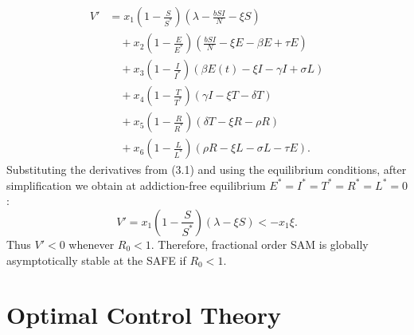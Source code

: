 \documentclass[10pt]{NSP1}
\begin{document}
\begin{equation}
\begin{aligned}
V' &= x_1 \left(1 - \frac{S}{S^*}\right) \left( \lambda - \frac{b S I}{N} - \xi S \right) \\
&\quad + x_2 \left(1 - \frac{E}{E^*}\right) \left( \frac{b S I}{N} - \xi E - \beta E + \tau E \right) \\
&\quad + x_3 \left(1 - \frac{I}{I^*}\right) \left( \beta E(t) - \xi I - \gamma I + \sigma L \right) \\
&\quad + x_4 \left(1 - \frac{T}{T^*}\right) \left( \gamma I - \xi T - \delta T \right) \\
&\quad + x_5 \left(1 - \frac{R}{R^*}\right) \left( \delta T - \xi R - \rho R \right) \\
&\quad + x_6 \left(1 - \frac{L}{L^*}\right) \left( \rho R - \xi L - \sigma L - \tau E \right).
\end{aligned}
\tag{4.12}
\end{equation}
Substituting the derivatives from (3.1) and using the equilibrium conditions, after simplification we obtain at addiction-free equilibrium $E^\ast = I^\ast = T^\ast = R^\ast = L^\ast = 0$:
\begin{equation}
V' = x_1 \left( 1 - \frac{S}{S^\ast} \right) (\lambda - \xi S) < - x_1 \xi.
\tag{4.13}
\end{equation}
Thus $V' < 0$ whenever $R_0 < 1$. Therefore, fractional order SAM is globally asymptotically stable at the SAFE if $R_0 < 1$.

\section{Optimal Control Theory}
\end{document}
